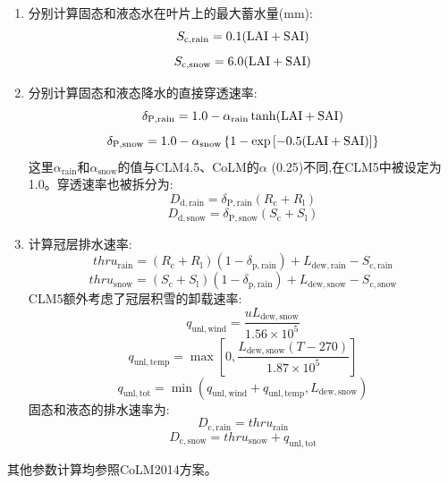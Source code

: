 \begin{enumerate}
  \item 分别计算固态和液态水在叶片上的最大蓄水量(mm):
    \begin{equation}
      S_{\mathrm{c,rain}}=0.1({\rm LAI}+{\rm SAI})
    \end{equation}
    \begin{equation}
      S_{\mathrm{c,snow}}=6.0({\rm LAI}+{\rm SAI})
    \end{equation}
  \item 分别计算固态和液态降水的直接穿透速率:
    \begin{equation}
      \delta_{\mathrm{P,rain}}=1.0 - \alpha_{\mathrm{rain}} \tanh({\rm LAI}+{\rm SAI})
    \end{equation}
    \begin{equation}
      \delta_{\mathrm{P,snow}}=1.0 - \alpha_{\mathrm{snow}}\left\{1-\exp\left[-0.5({\rm LAI}+{\rm SAI})\right]\right\}
    \end{equation}
    这里$\alpha_{\mathrm{rain}}$和$\alpha_{\mathrm{snow}}$的值与CLM4.5、CoLM的$\alpha$ (0.25)不同,在CLM5中被设定为1.0。穿透速率也被拆分为:
    \begin{equation}
      D_{\mathrm{d,rain}}=\delta_{\mathrm{P,rain}}(R_{\mathrm {c}} +R_{\mathrm{l}})
    \end{equation}
    \begin{equation}
      D_{\mathrm{d,snow}}=\delta_{\mathrm{P,snow}}(S_{\mathrm {c}} +S_{\mathrm{l}})
    \end{equation}
  \item 计算冠层排水速率:
    \begin{equation}
      thru_{\mathrm{rain}}=(R_{\mathrm {c}} +R_{\mathrm{l}})(1-\delta_{\mathrm{p,rain}})+L_{\mathrm{dew,rain}}-S_{\mathrm{c,rain}}
    \end{equation}
    \begin{equation}
      thru_{\mathrm{snow}}=(S_{\mathrm {c}} +S_{\mathrm{l}})(1-\delta_{\mathrm{p,rain}})+L_{\mathrm{dew,snow}}-S_{\mathrm{c,snow}}
    \end{equation}
    CLM5额外考虑了冠层积雪的卸载速率:
    \begin{equation}\label{q_unl_wind}
      q_{\mathrm{unl,wind}}=\frac{uL_{\mathrm{dew,snow}}}{1.56\times 10^5}
    \end{equation}
    \begin{equation}
      q_{\mathrm{unl,temp}}=\max\left[0, \frac{L_{\mathrm{dew,snow}}(T-270)}{1.87\times 10^5}\right]
    \end{equation}
    \begin{equation}\label{q_unl_tot}
      q_{\mathrm{unl,tot}}=\min(q_{\mathrm{unl,wind}}+q_{\mathrm{unl,temp}},L_{\mathrm{dew,snow}})
    \end{equation}
    固态和液态的排水速率为:
    \begin{equation}
      D_{\mathrm{c,rain}}=thru_{\mathrm{rain}}
    \end{equation}
    \begin{equation}
      D_{\mathrm{c,snow}}=thru_{\mathrm{snow}}+q_{\mathrm{unl,tot}}
    \end{equation}
\end{enumerate}
其他参数计算均参照CoLM2014方案。


